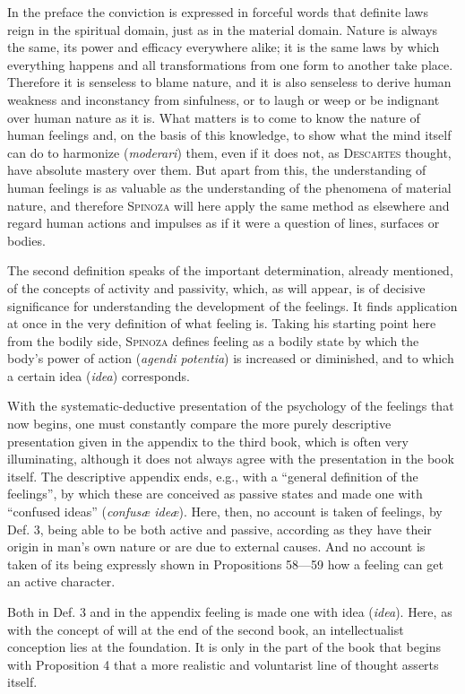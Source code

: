 \documentclass[12pt]{article}
\newcommand{\opage}[1]{\marginnote{\footnotesize\textit{[#1]}}}
\begin{document}
In the preface the conviction is expressed in forceful words that definite laws reign in the
spiritual domain, just as in the material domain. Nature is always the same, its power and
efficacy everywhere alike; it is the same laws by which everything happens and all
transformations from one form to another take place. Therefore it is senseless to blame
nature, and it is also senseless to derive human weakness and inconstancy from sinfulness, or
to laugh or weep or be indignant over human nature as it is. What matters is to come to know
the nature of human feelings and, on the basis of this knowledge, to show what the mind itself
can do to harmonize (\textit{moderari}) them, even if it does not, as \textsc{Descartes}
thought, have absolute mastery over them. But apart from this, the understanding of human
feelings is as valuable as the understanding of the phenomena of material nature, and
therefore \textsc{Spinoza} will here apply the same method as elsewhere and regard human
actions and impulses as if it were a question of lines, surfaces or bodies.

The second definition speaks of the important determination, already mentioned, of the
concepts of activity and passivity, which, as will appear, is of decisive significance for
understanding the development of the feelings. It finds application at once in the very
definition of what feeling is. Taking his starting point here from the bodily side,
\textsc{Spinoza} defines feeling as a bodily state by which the body's power of action
(\textit{agendi potentia}) is increased or diminished, and to which a certain idea
(\textit{idea}) corresponds.

With the systematic-deductive presentation of the psychology of the feelings that now begins,
one must constantly compare the more purely descriptive presentation given in the appendix to
the third book, which is often very illuminating, although it does not always agree with the
presentation in the book itself. The descriptive appendix ends, e.g., with a ``general
definition of the feelings'', by which these are conceived as passive states and made one with
``confused ideas'' (\textit{confusæ ideæ}). Here, then, no account is taken of feelings, by
Def. 3, being able to be both active and passive, according as they have their origin in
man's own nature or are due to external causes. And no account is taken of its being expressly
shown in Propositions 58---59 how a feeling can get an active character.

\opage{59}Both in Def. 3 and in the appendix feeling is made one with idea (\textit{idea}).
Here, as with the concept of will at the end of the second book, an intellectualist conception
lies at the foundation. It is only in the part of the book that begins with Proposition 4 that
a more realistic and voluntarist line of thought asserts itself.
\end{document}
